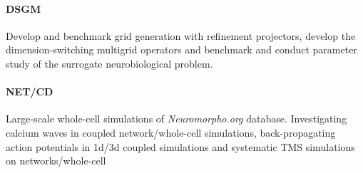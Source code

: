 \paragraph{DSGM}
Develop and benchmark grid generation with refinement projectors, develop the dimension-switching multigrid operators and benchmark and conduct parameter study of the surrogate
neurobiological problem.

\paragraph{NET/CD}
Large-scale whole-cell simulations of \textit{Neuromorpho.org} \cite{Ascoli2007} database.
Investigating calcium waves in coupled network/whole-cell simulations, back-propagating
action potentials in 1d/3d coupled simulations and systematic TMS simulations on networks/whole-cell
